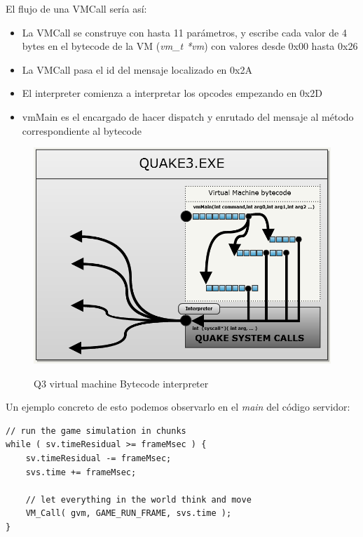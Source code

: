 \documentclass[a4paper,12pt]{report}
\begin{document}
	El flujo de una VMCall sería así:
	
	\begin{itemize}  
		\item La VMCall se construye con hasta 11 parámetros, y escribe cada valor de 4 bytes en el bytecode de la VM (\textit{vm\_t *vm}) con valores desde 0x00 hasta 0x26
		\item La VMCall pasa el id del mensaje localizado en 0x2A
		\item El interpreter comienza a interpretar los opcodes empezando en 0x2D
		\item vmMain es el encargado de hacer dispatch y enrutado del mensaje al método correspondiente al bytecode
	\end{itemize}

	\begin{center}
		\begin{figure}[h]
			\includegraphics[width=1\textwidth]{images/vm_bb}
			\label{fig:q3vm_bb}
			\caption{Q3 virtual machine Bytecode interpreter}
		\end{figure}
	\end{center}

	Un ejemplo concreto de esto podemos observarlo en el \textit{main} del código servidor:
	
		\begin{lstlisting}[style=C, numbers=none]
// run the game simulation in chunks
while ( sv.timeResidual >= frameMsec ) {
	sv.timeResidual -= frameMsec;
	svs.time += frameMsec;
	
	// let everything in the world think and move
	VM_Call( gvm, GAME_RUN_FRAME, svs.time );
}
	\end{lstlisting}
	
\end{document}
